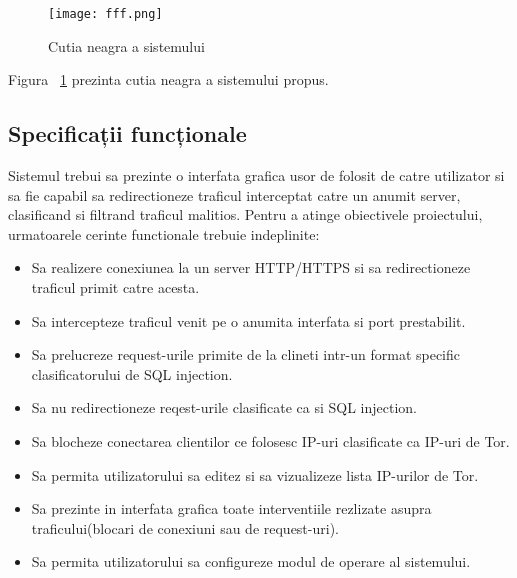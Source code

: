 \begin{figure}[h]
	\centering
	\texttt{[image: fff.png]}
	\caption{Cutia neagra a sistemului}
	\label{fig:black-box}
\end{figure}

Figura ~\ref{fig:black-box} prezinta cutia neagra a sistemului propus. \\

 \subsection{Specificații funcționale}

Sistemul trebui sa prezinte o interfata grafica usor de folosit de catre utilizator si sa fie capabil sa redirectioneze traficul interceptat catre un anumit server, clasificand si filtrand traficul malitios. Pentru a atinge obiectivele proiectului, urmatoarele cerinte functionale trebuie indeplinite:
\begin{itemize}
  \item Sa realizere conexiunea la un server HTTP/HTTPS si sa redirectioneze traficul primit catre acesta.
  \item Sa intercepteze traficul venit pe o anumita interfata si port prestabilit.
  \item Sa prelucreze request-urile primite de la clineti intr-un format specific clasificatorului de SQL injection.
  \item Sa nu redirectioneze reqest-urile clasificate ca si SQL injection.
  \item Sa blocheze conectarea clientilor ce folosesc IP-uri clasificate ca IP-uri de Tor.
  \item Sa permita utilizatorului sa editez si sa vizualizeze lista IP-urilor de Tor.
  \item Sa prezinte in interfata grafica toate interventiile rezlizate asupra traficului(blocari de conexiuni sau de request-uri).
  \item Sa permita utilizatorului sa configureze modul de operare al sistemului.
\end{itemize}


